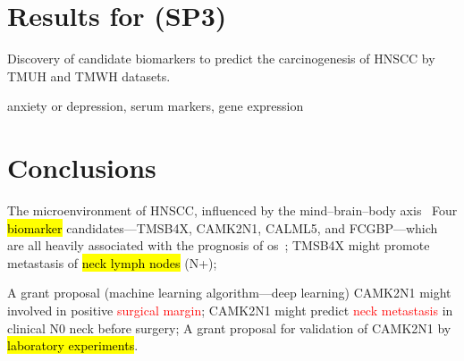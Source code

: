 \documentclass[
paper=landscape,
paper=160mm:90mm, %
fontsize=11pt, %
pagesize, %
parskip=half-, %
]{scrartcl} %
\theoremstyle{mythmstyle} %
\begin{document}
\clearpage

\section{Results for (SP3)}
\thispagestyle{headings}

\begin{outline}
\1 Discovery of candidate biomarkers to predict the carcinogenesis of HNSCC by TMUH and TMWH datasets.

\2 anxiety or depression, serum markers, gene expression

\end{outline}
\clearpage


\section*{Conclusions} %
\thispagestyle{headings}

\begin{outline}

\1 The microenvironment of HNSCC, influenced by the mind--brain--body axis~\autocite{Hsiao2012}
    \2 Four \hl{biomarker} candidates---TMSB4X, CAMK2N1, CALML5, and FCGBP---which are all heavily associated with the prognosis of \acrlong{os}~\autocite{Chi2017, Chi2021};
    \2 TMSB4X might promote metastasis of \hl{neck lymph nodes} (N+);

    

\1 A grant proposal (machine learning algorithm---deep learning)
    \2 CAMK2N1 might involved in positive \textcolor{red}{surgical margin};
    \2 CAMK2N1 might predict \textcolor{red}{neck metastasis} in clinical N0 neck before surgery;
\1 A grant proposal for validation of CAMK2N1 by \hl{laboratory experiments}.

\end{outline}
\end{document}
